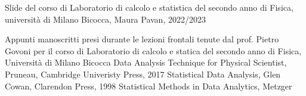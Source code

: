 \documentclass[11pt,a4paper]{book}
\begin{document}

\tableofcontents








\begin{thebibliography}{4}

 Slide del corso di Laboratorio di calcolo e statistica del secondo anno di Fisica, universit\`{a} di Milano Bicocca, Maura Pavan, 2022/2023

 Appunti manoscritti presi durante le lezioni frontali tenute dal prof. Pietro Govoni per il corso di Laboratorio di calcolo e statica del secondo anno di Fisica, Universit\`{a} di Milano Bicocca
 Data Analysis Technique for Physical Scientist, Pruneau, Cambridge Univeristy Press, 2017
 Statistical Data Analysis, Glen Cowan, Clarendon Press, 1998
 Statistical Methods in Data Analytics, Metzger
\end{thebibliography}
\end{document}
